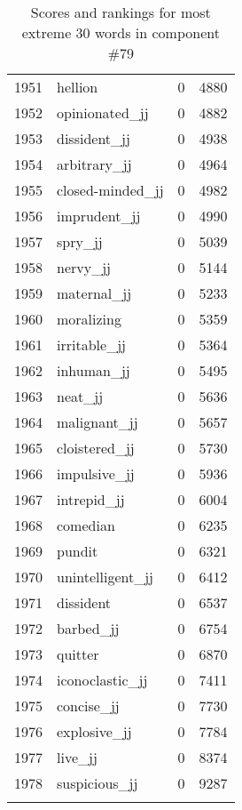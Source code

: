\begin{longtable}[!htbp]{| rlr@{.}l |}
    1951 & hellion & 0 & 4880 \\
    1952 & opinionated\_jj & 0 & 4882 \\
    1953 & dissident\_jj & 0 & 4938 \\
    1954 & arbitrary\_jj & 0 & 4964 \\
    1955 & closed-minded\_jj & 0 & 4982 \\
    1956 & imprudent\_jj & 0 & 4990 \\
    1957 & spry\_jj & 0 & 5039 \\
    1958 & nervy\_jj & 0 & 5144 \\
    1959 & maternal\_jj & 0 & 5233 \\
    1960 & moralizing & 0 & 5359 \\
    1961 & irritable\_jj & 0 & 5364 \\
    1962 & inhuman\_jj & 0 & 5495 \\
    1963 & neat\_jj & 0 & 5636 \\
    1964 & malignant\_jj & 0 & 5657 \\
    1965 & cloistered\_jj & 0 & 5730 \\
    1966 & impulsive\_jj & 0 & 5936 \\
    1967 & intrepid\_jj & 0 & 6004 \\
    1968 & comedian & 0 & 6235 \\
    1969 & pundit & 0 & 6321 \\
    1970 & unintelligent\_jj & 0 & 6412 \\
    1971 & dissident & 0 & 6537 \\
    1972 & barbed\_jj & 0 & 6754 \\
    1973 & quitter & 0 & 6870 \\
    1974 & iconoclastic\_jj & 0 & 7411 \\
    1975 & concise\_jj & 0 & 7730 \\
    1976 & explosive\_jj & 0 & 7784 \\
    1977 & live\_jj & 0 & 8374 \\
    1978 & suspicious\_jj & 0 & 9287 \\
    \hline
    \caption{Scores and rankings for most extreme 30 words in component \#79} \\
\end{longtable}
